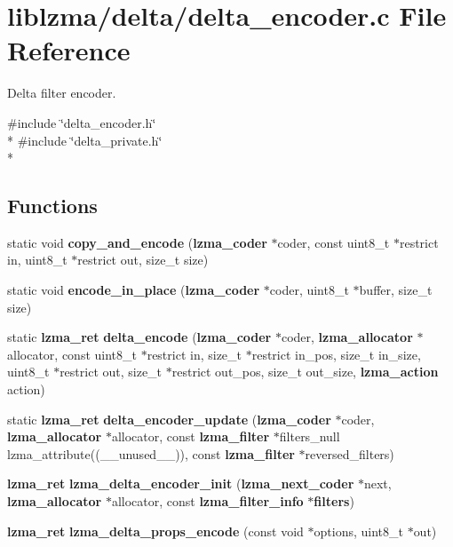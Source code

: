 \section{liblzma/delta/delta\-\_\-encoder.c File Reference}
\label{delta__encoder_8c}


Delta filter encoder.  


{\ttfamily \#include \char`\"{}delta\-\_\-encoder.\-h\char`\"{}}\\*
{\ttfamily \#include \char`\"{}delta\-\_\-private.\-h\char`\"{}}\\*
\subsection*{Functions}
\begin{DoxyCompactItemize}
\item 
static void {\bf copy\-\_\-and\-\_\-encode} ({\bf lzma\-\_\-coder} $\ast$coder, const uint8\-\_\-t $\ast$restrict in, uint8\-\_\-t $\ast$restrict out, size\-\_\-t size)
\item 
static void {\bf encode\-\_\-in\-\_\-place} ({\bf lzma\-\_\-coder} $\ast$coder, uint8\-\_\-t $\ast$buffer, size\-\_\-t size)
\item 
static {\bf lzma\-\_\-ret} {\bfseries delta\-\_\-encode} ({\bf lzma\-\_\-coder} $\ast$coder, {\bf lzma\-\_\-allocator} $\ast$allocator, const uint8\-\_\-t $\ast$restrict in, size\-\_\-t $\ast$restrict in\-\_\-pos, size\-\_\-t in\-\_\-size, uint8\-\_\-t $\ast$restrict out, size\-\_\-t $\ast$restrict out\-\_\-pos, size\-\_\-t out\-\_\-size, {\bf lzma\-\_\-action} action)\label{delta__encoder_8c_a929dd302bd6585f4b299bf0f4e2d0cbd}

\item 
static {\bf lzma\-\_\-ret} {\bfseries delta\-\_\-encoder\-\_\-update} ({\bf lzma\-\_\-coder} $\ast$coder, {\bf lzma\-\_\-allocator} $\ast$allocator, const {\bf lzma\-\_\-filter} $\ast$filters\-\_\-null lzma\-\_\-attribute((\-\_\-\-\_\-unused\-\_\-\-\_\-)), const {\bf lzma\-\_\-filter} $\ast$reversed\-\_\-filters)\label{delta__encoder_8c_a63aadb80cd148579d17442fd323d4b8b}

\item 
{\bf lzma\-\_\-ret} {\bfseries lzma\-\_\-delta\-\_\-encoder\-\_\-init} ({\bf lzma\-\_\-next\-\_\-coder} $\ast$next, {\bf lzma\-\_\-allocator} $\ast$allocator, const {\bf lzma\-\_\-filter\-\_\-info} $\ast${\bf filters})\label{delta__encoder_8c_a25a23568a3f2a9802296357475dc26bc}

\item 
{\bf lzma\-\_\-ret} {\bfseries lzma\-\_\-delta\-\_\-props\-\_\-encode} (const void $\ast$options, uint8\-\_\-t $\ast$out)\label{delta__encoder_8c_aeac2126d3a2fc0ab4e32a0d3b0e0fc9e}

\end{DoxyCompactItemize}


